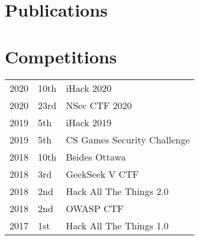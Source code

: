 \documentclass[]{deedy-resume-openfont}
\begin{document}
\begin{minipage}[t]{0.66\textwidth}
\begin{tightemize}
\end{tightemize}
\sectionsep


\section{Publications} 
\renewcommand\refname{\vskip -1.5em} %


\nocite{*}

\section{Competitions}

\begin{tabular}{rll}

2020      & 10th & iHack 2020\\

2020      & 23rd & NSec CTF 2020\\

2019      & 5th & iHack 2019\\

2019      & 5th & CS Games Security Challenge\\

2018      & 10th & Bsides Ottawa\\

2018	     & 3rd & GeekSeek V CTF\\

2018	     & 2nd & Hack All The Things 2.0\\

2018	     & 2nd & OWASP CTF\\

2017	     & 1st & Hack All The Things 1.0\\

\end{tabular}
\sectionsep

\end{minipage} 
\end{document}
